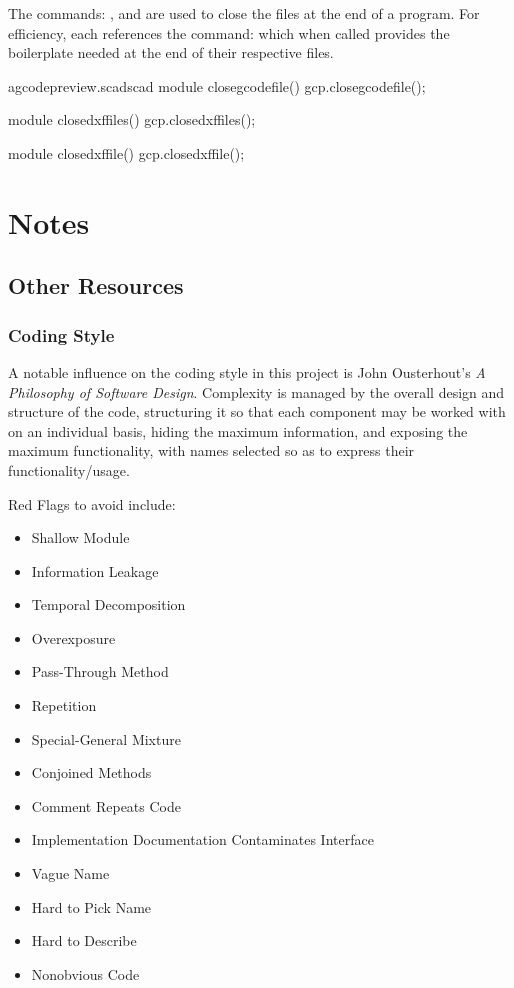 \documentclass{ltxdoc}
\begin{document}
The commands: , and  are used to close the files at the end of a program. For efficiency, each references the command:  which when called provides the boilerplate needed at the end of their respective files.

\lstset{firstnumber=\thegcpscad}
\begin{writecode}{a}{gcodepreview.scad}{scad}
module closegcodefile(){
    gcp.closegcodefile();
}

module closedxffiles(){
    gcp.closedxffiles();
}

module closedxffile(){
    gcp.closedxffile();
}

\end{writecode}
\addtocounter{gcpscad}{12}

\section{Notes}

\subsection*{Other Resources}

\subsubsection*{Coding Style}

A notable influence on the coding style in this project is John Ousterhout's \emph{A Philosophy of Software Design}\cite{Ousterhout2018APO}. Complexity is managed by the overall design and structure of the code, structuring it so that each component may be worked with on an individual basis, hiding the maximum information, and exposing the maximum functionality, with names selected so as to express their functionality/usage.

Red Flags to avoid include:

\begin{itemize}
\item Shallow Module
\item Information Leakage
\item Temporal Decomposition 
\item Overexposure
\item Pass-Through Method
\item Repetition
\item Special-General Mixture
\item Conjoined Methods
\item Comment Repeats Code
\item Implementation Documentation Contaminates Interface
\item Vague Name
\item Hard to Pick Name
\item Hard to Describe
\item Nonobvious Code
\end{itemize}
\end{document}
